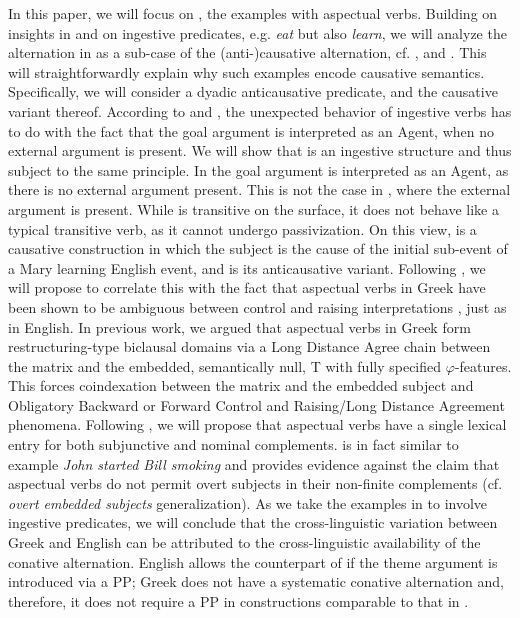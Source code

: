 \documentclass[output=paper]{langscibook}
\begin{document}
In this paper, we will focus on , the examples with aspectual verbs. 
Building on insights in \citet{Amberber1996} and \citet{Anagnostopoulou2001} on ingestive predicates, e.g. \textit{eat} but also \textit{learn}, 
we will analyze the alternation in  as a sub-case of the (anti-)causative alternation, cf. \citet{Levin1993}, and \citet{MourounasWilliamson2019}. 
This will straightforwardly explain why such examples encode causative semantics. 
Specifically, we will consider  a dyadic anticausative predicate, and  the causative variant thereof. 
According to \citet{Amberber1996} and \citet{Anagnostopoulou2001}, the unexpected behavior of ingestive verbs has to do with the fact 
that the goal argument is interpreted as an Agent, when no external argument is present. 
We will show that  is an ingestive structure and thus subject to the same principle. 
In  the goal argument is interpreted as an Agent, as there is no external argument present. 
This is not the case in , where the external argument is present. 
While  is transitive on the surface, it does not behave like a typical transitive verb, as it cannot undergo passivization. 
On this view,  is a causative construction in which the subject is the cause of the initial sub-event of a Mary learning English event, 
and  is its anticausative variant. 
Following \citet{MourounasWilliamson2019}, we will propose to correlate this with the fact that aspectual verbs in Greek have been shown 
to be ambiguous between control and raising interpretations 
\citep{alexiadouanagnostopoulou1999, Roussou2009, AlexiadouAnagnostopoulouIordachioaiaMarchis2010, AlexiadouAnagnostopoulouIordachioaiaMarchis2012, AlexiadouAnagnostopoulouWurmbrand2014}, 
just as in English. 
In previous work, we argued that aspectual verbs in Greek form restructuring-type biclausal domains via a Long Distance Agree chain 
between the matrix and the embedded, semantically null, T with fully specified $\varphi$-features. 
This forces coindexation between the matrix and the embedded subject and Obligatory Backward or Forward Control and Raising/Long Distance Agreement phenomena. 
Following \citet{MourounasWilliamson2019}, we will propose that aspectual verbs have a single lexical entry for both subjunctive and nominal complements. 
 is in fact similar to  example \textit{John started Bill smoking} and provides evidence against the claim 
that aspectual verbs do not permit overt subjects in their non-finite complements (cf.  \textit{overt embedded subjects} generalization). 
As we take the examples in  to involve ingestive predicates, we will conclude that the cross-linguistic variation between Greek and English 
can be attributed to the cross-linguistic availability of the conative alternation. 
English allows the counterpart of  if the theme argument is introduced via a PP; 
Greek does not have a systematic conative alternation and, therefore, it does not require a PP in constructions comparable to that in . 
\end{document}
